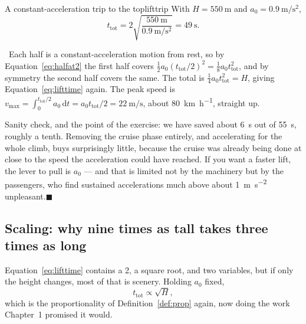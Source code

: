 \documentclass[11pt,twoside,openany]{book}
\newcommand{\dd}{\mathrm{d}}
\newcounter{check}[chapter]
\newcommand{\viewtag}[3]{\fcolorbox{#2}{#3}{\footnotesize\textbf{\textcolor{#2}{#1}}}}
\newcommand{\calctag}{\viewtag{Calculus}{calccol}{calcpale}}
\newcommand{\calc}{\par\medskip\noindent\calctag\ }
\newcommand{\qed}{\hfill$\blacksquare$}
\begin{document}
\begin{example}{A constant-acceleration trip to the top}{lifttrip}
With $H = \SI{550}{\metre}$ and $a_0 = \SI{0.9}{\metre\per\second\squared}$,
\[
t_{\text{tot}} = 2\sqrt{\frac{\SI{550}{\metre}}{\SI{0.9}{\metre\per\second\squared}}} = \SI{49}{\second}.
\]

\calc Each half is a constant-acceleration motion from rest, so by Equation~\eqref{eq:halfat2} the first half covers $\tfrac12 a_0 (t_{\text{tot}}/2)^2 = \tfrac18 a_0 t_{\text{tot}}^2$, and by symmetry the second half covers the same. The total is $\tfrac14 a_0 t_{\text{tot}}^2 = H$, giving Equation~\eqref{eq:lifttime} again. The peak speed is $v_{\max} = \int_0^{t_{\text{tot}}/2} a_0\,\dd t = a_0 t_{\text{tot}}/2 = \SI{22}{\metre\per\second}$, about \SI{80}{\kilo\metre\per\hour}, straight up.

Sanity check, and the point of the exercise: we have saved about \SI{6}{\second} out of \SI{55}{\second}, roughly a tenth. Removing the cruise phase entirely, and accelerating for the whole climb, buys surprisingly little, because the cruise was already being done at close to the speed the acceleration could have reached. If you want a faster lift, the lever to pull is $a_0$ --- and that is limited not by the machinery but by the passengers, who find sustained accelerations much above about \SI{1}{\metre\per\second\squared} unpleasant.\qed
\end{example}

\subsection{Scaling: why nine times as tall takes three times as long}

Equation~\eqref{eq:lifttime} contains a \num{2}, a square root, and two variables, but if only the height changes, most of that is scenery. Holding $a_0$ fixed,
\[
t_{\text{tot}} \propto \sqrt{H},
\]
which is the proportionality of Definition~\ref{def:prop} again, now doing the work Chapter~1 promised it would.
\end{document}
